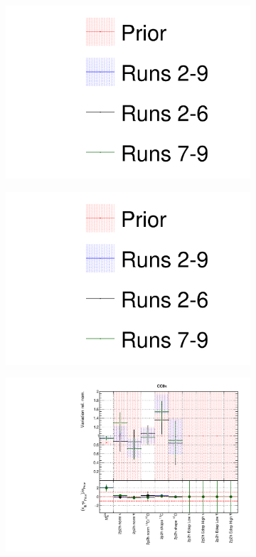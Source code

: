 \begin{figure}
\centering
\begin{subfigure}{0.3\textwidth}
  \centering
  \includegraphics[width=1.0\linewidth, trim={5mm  90mm 0mm 0mm}, clip]{figs/newolddatafits_leg}
\end{subfigure}
\begin{subfigure}{0.3\textwidth}
  \centering
  \includegraphics[width=1.0\linewidth, trim={5mm  0mm 0mm 95mm}, clip]{figs/newolddatafits_leg}
\end{subfigure}
\begin{subfigure}{0.49\textwidth}
  \centering
  \includegraphics[width=0.9\linewidth]{figs/newolddatafitsxsec_1}

\end{subfigure}
\end{figure}
